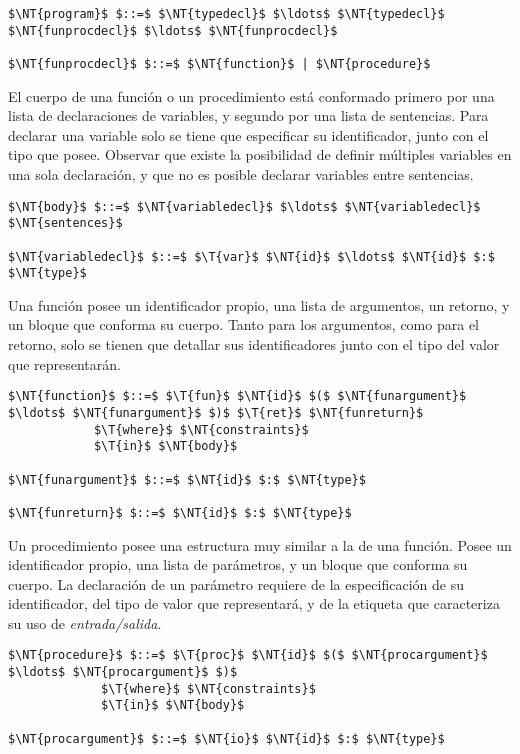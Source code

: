 \begin{lstlisting}[style = syntax]
$\NT{program}$ $::=$ $\NT{typedecl}$ $\ldots$ $\NT{typedecl}$ $\NT{funprocdecl}$ $\ldots$ $\NT{funprocdecl}$

$\NT{funprocdecl}$ $::=$ $\NT{function}$ | $\NT{procedure}$
\end{lstlisting}

El cuerpo de una función o un procedimiento está conformado primero por una lista de declaraciones de variables, y segundo por una lista de sentencias.
Para declarar una variable solo se tiene que especificar su identificador, junto con el tipo que posee.
Observar que existe la posibilidad de definir múltiples variables en una sola declaración, y que no es posible declarar variables entre sentencias.

\begin{lstlisting}[style = syntax]
$\NT{body}$ $::=$ $\NT{variabledecl}$ $\ldots$ $\NT{variabledecl}$ $\NT{sentences}$

$\NT{variabledecl}$ $::=$ $\T{var}$ $\NT{id}$ $\ldots$ $\NT{id}$ $:$ $\NT{type}$
\end{lstlisting}

Una función posee un identificador propio, una lista de argumentos, un retorno, y un bloque que conforma su cuerpo.
Tanto para los argumentos, como para el retorno, solo se tienen que detallar sus identificadores junto con el tipo del valor que representarán.

\begin{lstlisting}[style = syntax]
$\NT{function}$ $::=$ $\T{fun}$ $\NT{id}$ $($ $\NT{funargument}$ $\ldots$ $\NT{funargument}$ $)$ $\T{ret}$ $\NT{funreturn}$
            $\T{where}$ $\NT{constraints}$
            $\T{in}$ $\NT{body}$

$\NT{funargument}$ $::=$ $\NT{id}$ $:$ $\NT{type}$

$\NT{funreturn}$ $::=$ $\NT{id}$ $:$ $\NT{type}$
\end{lstlisting}

Un procedimiento posee una estructura muy similar a la de una función.
Posee un identificador propio, una lista de parámetros, y un bloque que conforma su cuerpo.
La declaración de un parámetro requiere de la especificación de su identificador, del tipo de valor que representará, y de la etiqueta que caracteriza su uso de \textit{entrada/salida}.

\begin{lstlisting}[style = syntax]
$\NT{procedure}$ $::=$ $\T{proc}$ $\NT{id}$ $($ $\NT{procargument}$ $\ldots$ $\NT{procargument}$ $)$
             $\T{where}$ $\NT{constraints}$
             $\T{in}$ $\NT{body}$

$\NT{procargument}$ $::=$ $\NT{io}$ $\NT{id}$ $:$ $\NT{type}$
\end{lstlisting}

